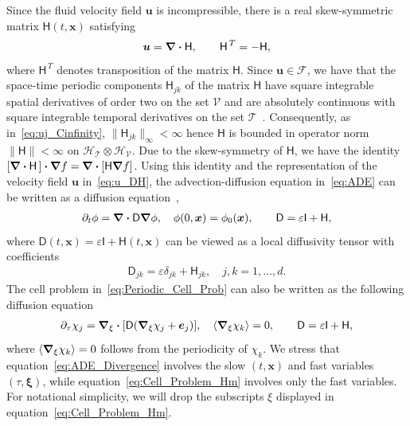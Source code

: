 \documentclass[leqno,onefignum,onetabnum]{siamltex1213}
\newcommand{\Tc}{\mathcal{T}}
\newcommand{\Vc}{\mathcal{V}}
\newcommand{\Hc}{\mathcal{H}}
\newcommand{\Fc}{\mathcal{F}}
\newcommand{\Dm}{\mathsf{D}}
\newcommand{\Hm}{\mathsf{H}}
\newcommand{\Ib}{\mathsf{I}}
\newcommand\bnabla{\mbox{\boldmath${\nabla}$}}
\providecommand\bcdot{\boldsymbol{\cdot}}
\newcommand{\vecx}{\boldsymbol{x}}
\newcommand{\vecu}{\boldsymbol{u}}
\newcommand{\vece}{\boldsymbol{e}}
\newcommand{\vecxi}{\boldsymbol{\xi}}
\begin{document}
Since the fluid velocity field $\vecu$ is incompressible, there is a
real skew-symmetric matrix $\Hm(t,\vecx)$
satisfying~\cite{Avellaneda:PRL-753,Avellaneda:CMP-339}   
% 
\begin{align}\label{eq:u_DH}
 \vecu =\bnabla \bcdot\Hm, \qquad   \Hm^{\,T}=-\Hm,
\end{align}
% 
where $\Hm^{\,T}$ denotes transposition of the matrix $\Hm$. Since
$\vecu\in\Fc$, we have that the space-time periodic components
$\Hm_{jk}$ of the matrix $\Hm$ have square integrable spatial
derivatives of order two on the set $\Vc$ and are 
absolutely continuous with square integrable temporal derivatives on
the set $\Tc$~\cite{Bhattacharya:AAP:1999:951}. Consequently, as
in~\eqref{eq:uj_Cinfinity}, $\|\Hm_{jk}\|_\infty<\infty$ hence $\Hm$ is bounded in
operator norm $\|\Hm\|<\infty$ on $\Hc_{\Tc}\otimes\Hc_{\Vc}$. Due to  
the skew-symmetry of $\Hm$, we have the identity
$[\bnabla\bcdot\Hm\,]\bcdot\bnabla f=\bnabla\bcdot[\Hm\bnabla f]$. Using
this identity and the representation of the velocity field $\vecu$
in~\eqref{eq:u_DH}, the advection-diffusion equation in~\eqref{eq:ADE}
can be written as a diffusion
equation~\cite{Fannjiang:1994:SIAM_JAM:333,Novikov:2005:CPAM:867},    
%
\begin{align}\label{eq:ADE_Divergence}
  \partial_t\phi%
    =\bnabla \bcdot\Dm\bnabla \phi, \quad
    \phi(0,\vecx)=\phi_0(\vecx),
    \qquad
    \Dm=\varepsilon\Ib+\Hm,
\end{align}
%
where $\Dm(t,\vecx)=\varepsilon\Ib+\Hm(t,\vecx)$ can be viewed as a local
diffusivity tensor with coefficients
%
\begin{align}\label{eq:kappa_coeff}
  \Dm_{jk}=\varepsilon\delta_{jk}+\Hm_{jk},\quad j,k=1,\ldots,d.
\end{align}
%
The cell problem in~\eqref{eq:Periodic_Cell_Prob} can also be
written as the following diffusion
equation~\cite{Fannjiang:1994:SIAM_JAM:333,Novikov:2005:CPAM:867}     
% 
\begin{align}\label{eq:Cell_Problem_Hm}
  \partial_\tau\chi_j=\bnabla_\xi \bcdot[\Dm(\bnabla_\xi \chi_j+\vece_j)],
  \quad
  \langle\bnabla_\xi \chi_k\rangle=0, \qquad
  \Dm=\varepsilon\Ib+\Hm,
\end{align}
%
where $\langle\bnabla_\xi \chi_k\rangle=0$ follows from the periodicity of $\chi_k$. We
stress that equation~\eqref{eq:ADE_Divergence} involves the slow
$(t,\vecx)$ and fast variables $(\tau,\vecxi)$, while
equation~\eqref{eq:Cell_Problem_Hm} involves only the fast variables. 
For notational simplicity, we will drop the subscripts $\xi$ displayed
in equation~\eqref{eq:Cell_Problem_Hm}. 
\end{document}
